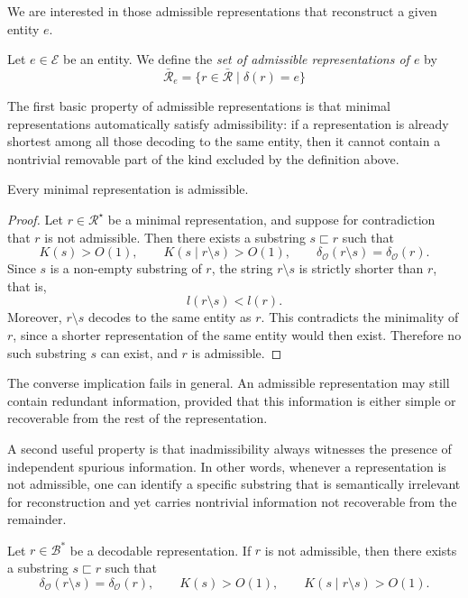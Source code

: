 We are interested in those admissible representations that reconstruct a given entity $e$.

\begin{definition}
Let \(e \in \mathcal{E}\) be an entity. We define the \emph{set of admissible representations of $e$} by
\[
\bar{\mathcal{R}}_{e} = \bigl\{ r \in \bar{\mathcal{R}} \;\big|\; \delta(r)=e \bigr\}
\]
\end{definition}

The first basic property of admissible representations is that minimal representations automatically satisfy admissibility: if a representation is already shortest among all those decoding to the same entity, then it cannot contain a nontrivial removable part of the kind excluded by the definition above.

\begin{proposition}
Every minimal representation is admissible.
\end{proposition}

\begin{proof}
Let $r\in\mathcal{R}^{\star}$ be a minimal representation, and suppose for contradiction that $r$ is not admissible. Then there exists a substring $s\sqsubset r$ such that
\[
K(s)>O(1), \qquad K(s\mid r\setminus s)>O(1), \qquad
\delta_{\mathcal O}(r\setminus s)=\delta_{\mathcal O}(r).
\]
Since $s$ is a non-empty substring of $r$, the string $r\setminus s$ is strictly shorter than $r$, that is,
\[
l(r\setminus s)<l(r).
\]
Moreover, $r\setminus s$ decodes to the same entity as $r$. This contradicts the minimality of $r$, since a shorter representation of the same entity would then exist. Therefore no such substring $s$ can exist, and $r$ is admissible.
\end{proof}

The converse implication fails in general. An admissible representation may still contain redundant information, provided that this information is either simple or recoverable from the rest of the representation.

A second useful property is that inadmissibility always witnesses the presence of independent spurious information. In other words, whenever a representation is not admissible, one can identify a specific substring that is semantically irrelevant for reconstruction and yet carries nontrivial information not recoverable from the remainder.

\begin{proposition}
Let $r\in\mathcal{B}^\ast$ be a decodable representation. If $r$ is not admissible, then there exists a substring $s\sqsubset r$ such that
\[
\delta_{\mathcal O}(r\setminus s)=\delta_{\mathcal O}(r),
\qquad
K(s)>O(1),
\qquad
K(s\mid r\setminus s)>O(1).
\]
\end{proposition}

